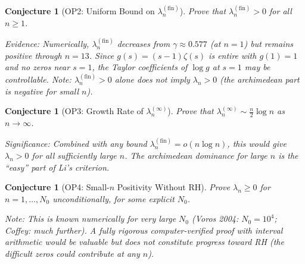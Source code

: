 \documentclass[12pt,a4paper]{article}
\newtheorem{conjecture}[theorem]{Conjecture}
\theoremstyle{definition}
\theoremstyle{remark}
\begin{document}
\begin{conjecture}[OP2: Uniform Bound on $\lambda_n^{(\mathrm{fin})}$]
Prove that $\lambda_n^{(\mathrm{fin})} > 0$ for all $n \geq 1$.

\emph{Evidence:} Numerically, $\lambda_n^{(\mathrm{fin})}$ decreases from $\gamma \approx 0.577$ (at $n=1$) but remains positive through $n=13$. Since $g(s) = (s-1)\zeta(s)$ is entire with $g(1)=1$ and no zeros near $s=1$, the Taylor coefficients of $\log g$ at $s=1$ may be controllable. Note: $\lambda_n^{(\mathrm{fin})} > 0$ alone does not imply $\lambda_n > 0$ (the archimedean part is negative for small $n$).
\end{conjecture}

\begin{conjecture}[OP3: Growth Rate of $\lambda_n^{(\infty)}$]
Prove that $\lambda_n^{(\infty)} \sim \frac{n}{2}\log n$ as $n \to \infty$.

\emph{Significance:} Combined with any bound $\lambda_n^{(\mathrm{fin})} = o(n\log n)$, this would give $\lambda_n > 0$ for all sufficiently large $n$. The archimedean dominance for large $n$ is the ``easy'' part of Li's criterion.
\end{conjecture}

\begin{conjecture}[OP4: Small-$n$ Positivity Without RH]
Prove $\lambda_n \geq 0$ for $n = 1, \ldots, N_0$ unconditionally, for some explicit $N_0$.

\emph{Note:} This is known numerically for very large $N_0$ (Voros 2004: $N_0 = 10^4$; Coffey: much further). A fully rigorous computer-verified proof with interval arithmetic would be valuable but does not constitute progress toward RH (the difficult zeros could contribute at any $n$).
\end{conjecture}
\end{document}
